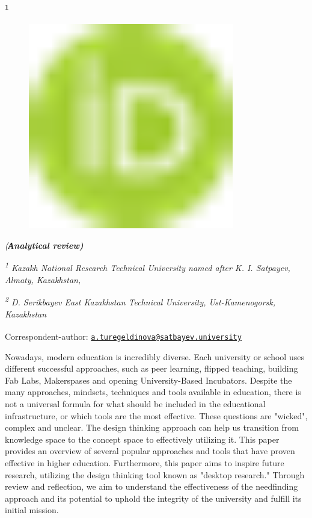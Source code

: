 \textsuperscript{{\bfseries 1}}
\begin{figure}[H]
	\centering
	\includegraphics[width=0.8\textwidth]{media/ekon2/image1}
	\caption*{}
\end{figure}

\emph{({\bfseries Аnalytical review)}}

\emph{\textsuperscript{1} Kazakh National Research Technical University
named after K. I. Satpayev, Almaty, Kazakhstan,}

\emph{\textsuperscript{2} D. Serikbayev East Kazakhstan Technical
University, Ust-Kamenogorsk, Kazakhstan}

{\bfseries \textsuperscript{\envelope }}Correspondent-author:
\href{mailto:a.turegeldinova@satbayev.university}{\nolinkurl{a.turegeldinova@satbayev.university}}

Nowadays, modern education is incredibly diverse. Each university or
school uses different successful approaches, such as peer learning,
flipped teaching, building Fab Labs, Makerspases and opening
University-Based Incubators. Despite the many approaches, mindsets,
techniques and tools available in education, there is not a universal
formula for what should be included in the educational infrastructure,
or which tools are the most effective. These questions are "wicked",
complex and unclear. The design thinking approach can help us transition
from knowledge space to the concept space to effectively utilizing it.
This paper provides an overview of several popular approaches and tools
that have proven effective in higher education. Furthermore, this paper
aims to inspire future research, utilizing the design thinking tool
known as "desktop research." Through review and reflection, we aim to
understand the effectiveness of the needfinding approach and its
potential to uphold the integrity of the university and fulfill its
initial mission.

